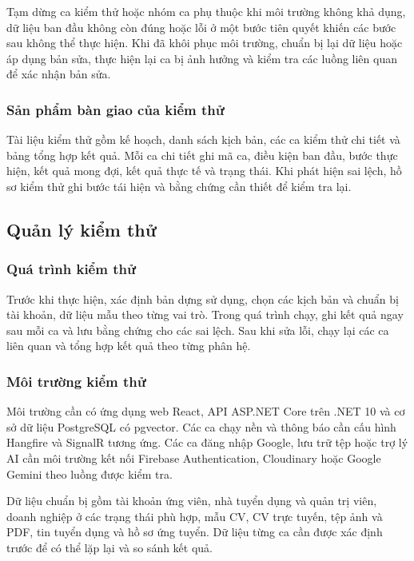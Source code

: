 Tạm dừng ca kiểm thử hoặc nhóm ca phụ thuộc khi môi trường không khả dụng, dữ liệu ban đầu không còn đúng hoặc lỗi ở một bước tiên quyết khiến các bước sau không thể thực hiện. Khi đã khôi phục môi trường, chuẩn bị lại dữ liệu hoặc áp dụng bản sửa, thực hiện lại ca bị ảnh hưởng và kiểm tra các luồng liên quan để xác nhận bản sửa.

\subsubsection{Sản phẩm bàn giao của kiểm thử}

Tài liệu kiểm thử gồm kế hoạch, danh sách kịch bản, các ca kiểm thử chi tiết và bảng tổng hợp kết quả. Mỗi ca chi tiết ghi mã ca, điều kiện ban đầu, bước thực hiện, kết quả mong đợi, kết quả thực tế và trạng thái. Khi phát hiện sai lệch, hồ sơ kiểm thử ghi bước tái hiện và bằng chứng cần thiết để kiểm tra lại.

\subsection{Quản lý kiểm thử}

\subsubsection{Quá trình kiểm thử}

Trước khi thực hiện, xác định bản dựng sử dụng, chọn các kịch bản và chuẩn bị tài khoản, dữ liệu mẫu theo từng vai trò. Trong quá trình chạy, ghi kết quả ngay sau mỗi ca và lưu bằng chứng cho các sai lệch. Sau khi sửa lỗi, chạy lại các ca liên quan và tổng hợp kết quả theo từng phân hệ.

\subsubsection{Môi trường kiểm thử}

Môi trường cần có ứng dụng web React, API ASP.NET Core trên .NET 10 và cơ sở dữ liệu PostgreSQL có pgvector. Các ca chạy nền và thông báo cần cấu hình Hangfire và SignalR tương ứng. Các ca đăng nhập Google, lưu trữ tệp hoặc trợ lý AI cần môi trường kết nối Firebase Authentication, Cloudinary hoặc Google Gemini theo luồng được kiểm tra.

Dữ liệu chuẩn bị gồm tài khoản ứng viên, nhà tuyển dụng và quản trị viên, doanh nghiệp ở các trạng thái phù hợp, mẫu CV, CV trực tuyến, tệp ảnh và PDF, tin tuyển dụng và hồ sơ ứng tuyển. Dữ liệu từng ca cần được xác định trước để có thể lặp lại và so sánh kết quả.


